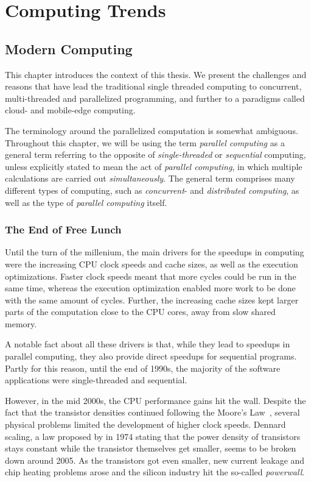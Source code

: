 \chapter{Computing Trends}
\label{chapter:computing-trends}

\section{Modern Computing}
This chapter introduces the context of this thesis. We present the challenges and reasons that have lead the traditional single threaded computing to concurrent, multi-threaded and parallelized programming, and further to a paradigms called cloud- and mobile-edge computing.

The terminology around the parallelized computation is somewhat ambiguous. Throughout this chapter, we will be using the term \emph{parallel computing} as a general term referring to the opposite of \emph{single-threaded} or \emph{sequential} computing, unless explicitly stated to mean the act of \emph{parallel computing}, in which multiple calculations are carried out \emph{simultaneously}. The general term comprises many different types of computing, such as \emph{concurrent}- and \emph{distributed computing}, as well as the type of \emph{parallel computing} itself.

\subsection{The End of Free Lunch}
\label{subsection:the-end-of-free-lunch}
Until the turn of the millenium, the main drivers for the speedups in computing were the increasing  CPU clock speeds and cache sizes, as well as the execution optimizations. Faster clock speeds meant that more cycles could be run in the same time, whereas the execution optimization enabled more work to be done with the same amount of cycles. Further, the increasing cache sizes kept larger parts of the computation close to the CPU cores, away from slow shared memory.~\cite{Sutter:2005:FLiO}

A notable fact about all these drivers is that, while they lead to speedups in parallel computing, they also provide direct speedups for sequential programs. Partly for this reason, until the end of 1990s, the majority of the software applications were single-threaded and sequential.~\cite{Sutter:2005:FLiO}

However, in the mid 2000s, the CPU performance gains hit the wall. Despite the fact that the transistor densities continued following the Moore's Law~\cite{Moore:1998:MooresLaw}, several physical problems limited the development of higher clock speeds. Dennard scaling, a law proposed by in 1974 stating that the power density of transistors stays constant while the transistor themselves get smaller, seems to be broken down around 2005. As the transistors got even smaller, new current leakage and chip heating problems arose and the silicon industry hit the so-called \emph{powerwall}.~\cite{Esmaeilzadeh:2011:DSE, Sutter:2005:FLiO}

